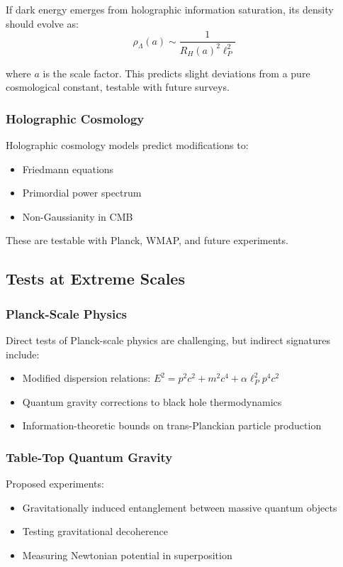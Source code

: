 \documentclass[11pt,a4paper]{article}
\theoremstyle{plain}
\theoremstyle{definition}
\theoremstyle{remark}
\begin{document}
If dark energy emerges from holographic information saturation, its density should evolve as:
\begin{equation}
\rho_{\Lambda}(a) \sim \frac{1}{R_H(a)^2\ell_P^2}
\end{equation}

where $a$ is the scale factor. This predicts slight deviations from a pure cosmological constant, testable with future surveys.

\subsubsection{Holographic Cosmology}

Holographic cosmology models predict modifications to:
\begin{itemize}[leftmargin=*]
\item Friedmann equations
\item Primordial power spectrum
\item Non-Gaussianity in CMB
\end{itemize}

These are testable with Planck, WMAP, and future experiments.

\subsection{Tests at Extreme Scales}

\subsubsection{Planck-Scale Physics}

Direct tests of Planck-scale physics are challenging, but indirect signatures include:

\begin{itemize}[leftmargin=*]
\item Modified dispersion relations: $E^2 = p^2c^2 + m^2c^4 + \alpha\ell_P^2 p^4c^2$
\item Quantum gravity corrections to black hole thermodynamics
\item Information-theoretic bounds on trans-Planckian particle production
\end{itemize}

\subsubsection{Table-Top Quantum Gravity}

Proposed experiments:
\begin{itemize}[leftmargin=*]
\item Gravitationally induced entanglement between massive quantum objects
\item Testing gravitational decoherence
\item Measuring Newtonian potential in superposition
\end{itemize}
\end{document}
